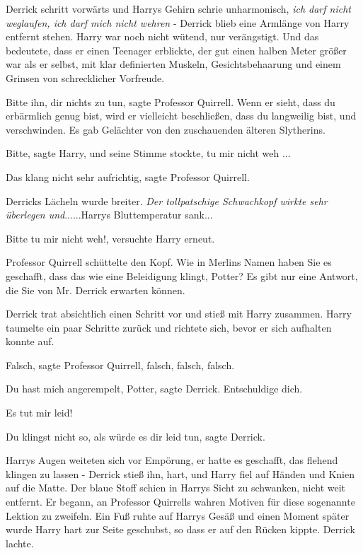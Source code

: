 Derrick schritt vorwärts und Harrys Gehirn schrie unharmonisch, \emph{ich darf
nicht weglaufen, ich darf mich nicht wehren }- Derrick blieb eine Armlänge von
Harry entfernt stehen. Harry war noch nicht wütend, nur verängstigt. Und das
bedeutete, dass er einen Teenager erblickte, der gut einen halben Meter größer
war als er selbst, mit klar definierten Muskeln, Gesichtsbehaarung und einem
Grinsen von schrecklicher Vorfreude.

\glqq Bitte ihn, dir nichts zu tun\grqq{}, sagte Professor Quirrell. \glqq Wenn
er sieht, dass du erbärmlich genug bist, wird er vielleicht beschließen, dass du
langweilig bist, und verschwinden.\grqq{} Es gab Gelächter von den zuschauenden
älteren Slytherins.

\glqq Bitte\grqq{}, sagte Harry, und seine Stimme stockte, \glqq tu mir nicht
weh ...\grqq{}

\glqq Das klang nicht sehr aufrichtig\grqq{}, sagte Professor Quirrell.

Derricks Lächeln wurde breiter. \emph{Der tollpatschige Schwachkopf wirkte sehr
überlegen und}......Harrys Bluttemperatur sank...

\glqq Bitte tu mir nicht weh!\grqq{}, versuchte Harry erneut.

Professor Quirrell schüttelte den Kopf. \glqq Wie in Merlins Namen haben Sie es
geschafft, dass das wie eine Beleidigung klingt, Potter? Es gibt nur eine
Antwort, die Sie von Mr. Derrick erwarten können.\grqq{}

Derrick trat absichtlich einen Schritt vor und stieß mit Harry zusammen. Harry
taumelte ein paar Schritte zurück und richtete sich, bevor er sich aufhalten
konnte auf.

\glqq Falsch\grqq{}, sagte Professor Quirrell, \glqq falsch, falsch,
falsch.\grqq{}

\glqq Du hast mich angerempelt, Potter\grqq{}, sagte Derrick. \glqq Entschuldige
dich.\grqq{}

\glqq Es tut mir leid!\grqq{}

\glqq Du klingst nicht so, als würde es dir leid tun\grqq{}, sagte Derrick.

Harrys Augen weiteten sich vor Empörung, er hatte es geschafft, das flehend
klingen zu lassen - Derrick stieß ihn, hart, und Harry fiel auf Händen und Knien
auf die Matte. Der blaue Stoff schien in Harrys Sicht zu schwanken, nicht weit
entfernt. Er begann, an Professor Quirrells wahren Motiven für diese sogenannte
Lektion zu zweifeln. Ein Fuß ruhte auf Harrys Gesäß und einen Moment später
wurde Harry hart zur Seite geschubst, so dass er auf den Rücken kippte. Derrick
lachte.

